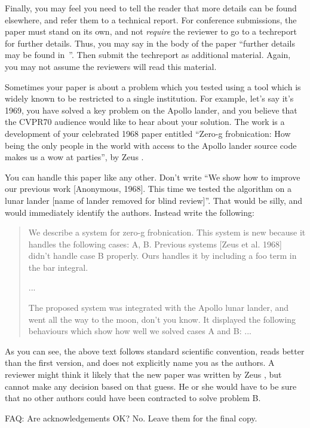 \documentclass[10pt,twocolumn,letterpaper]{article}
\begin{document}
Finally, you may feel you need to tell the reader that more details can be
found elsewhere, and refer them to a technical report.  For conference
submissions, the paper must stand on its own, and not {\em require} the
reviewer to go to a techreport for further details.  Thus, you may say in
the body of the paper ``further details may be found
in~\cite{Authors14b}''.  Then submit the techreport as additional material.
Again, you may not assume the reviewers will read this material.

Sometimes your paper is about a problem which you tested using a tool which
is widely known to be restricted to a single institution.  For example,
let's say it's 1969, you have solved a key problem on the Apollo lander,
and you believe that the CVPR70 audience would like to hear about your
solution.  The work is a development of your celebrated 1968 paper entitled
``Zero-g frobnication: How being the only people in the world with access to
the Apollo lander source code makes us a wow at parties'', by Zeus \etal.

You can handle this paper like any other.  Don't write ``We show how to
improve our previous work [Anonymous, 1968].  This time we tested the
algorithm on a lunar lander [name of lander removed for blind review]''.
That would be silly, and would immediately identify the authors. Instead
write the following:
\begin{quotation}
\noindent
   We describe a system for zero-g frobnication.  This
   system is new because it handles the following cases:
   A, B.  Previous systems [Zeus et al. 1968] didn't
   handle case B properly.  Ours handles it by including
   a foo term in the bar integral.

   ...

   The proposed system was integrated with the Apollo
   lunar lander, and went all the way to the moon, don't
   you know.  It displayed the following behaviours
   which show how well we solved cases A and B: ...
\end{quotation}
As you can see, the above text follows standard scientific convention,
reads better than the first version, and does not explicitly name you as
the authors.  A reviewer might think it likely that the new paper was
written by Zeus \etal, but cannot make any decision based on that guess.
He or she would have to be sure that no other authors could have been
contracted to solve problem B.

FAQ: Are acknowledgements OK?  No.  Leave them for the final copy.
\end{document}
